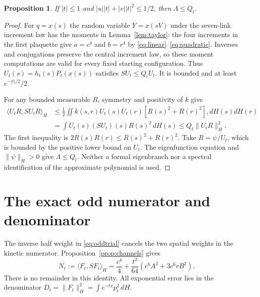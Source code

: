 \documentclass[11pt]{article}
\newtheorem{proposition}[theorem]{Proposition}
\begin{document}
\begin{proposition}\label{prop:lambda}
If $|t|\leq1$ and $|u||t|+|v||t|^2\leq1/2$, then
$\Lambda\leq Q_t$.
\end{proposition}
\begin{proof}
For $q=x(s)$ the random variable $Y=x(sV)$ under the seven-link
increment law has the moments in Lemma~\ref{lem:taylor}: the four
increments in the first plaquette give $a=c^4$ and $b=r^4$ by
\eqref{eq:linear}--\eqref{eq:quadratic}. Inverses and conjugations
preserve the central increment law, so these moment computations are
valid for every fixed starting configuration. Thus
$U_t(s)=h_t(s)P_t(x(s))$ satisfies $SU_t\leq Q_tU_t$.
It is bounded and at least $e^{-|t|/2}/2$.

For any bounded measurable $R$, symmetry and positivity of $k$ give
\begin{align*}
 \langle U_tR,SU_tR\rangle_H
 &\leq\frac12\iint k(s,r)U_t(s)U_t(r)[R(s)^2+R(r)^2],dH(s)dH(r)\\
 &=\int U_t(s)(SU_t)(s)R(s)^2\,dH(s)
 \leq Q_t\|U_tR\|_H^2.
\end{align*}
The first inequality is $2R(s)R(r)\leq R(s)^2+R(r)^2$.
Take $R=\psi/U_t$, which is bounded by the positive lower bound
on $U_t$. The eigenfunction equation and $\|\psi\|_H>0$ give
$\Lambda\leq Q_t$. Neither a formal eigenbranch nor a spectral
identification of the approximate polynomial is used.
\end{proof}

\section{The exact odd numerator and denominator}
The inverse half weight in \eqref{eq:oddtrial} cancels the two spatial
weights in the kinetic numerator. Proposition~\ref{prop:channels} gives
\begin{equation}\label{eq:numerator}
 N_t:=\langle F_t,SF_t\rangle_H
 =\frac{c^4}4+\frac{t^2}{64}(c^6A^2+3c^6rB^2).
\end{equation}
There is no remainder in this identity. All exponential error lies in
the denominator $D_t=\|F_t\|_H^2=\int e^{-tx}p_t^2\,dH$.
\end{document}
